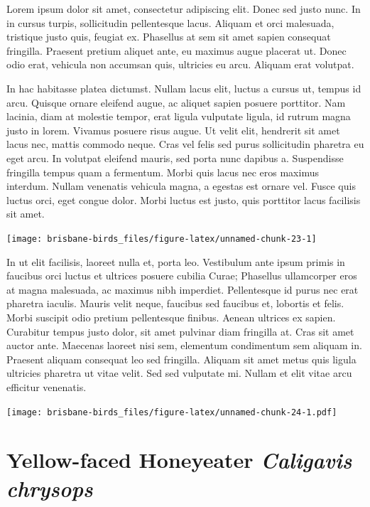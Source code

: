 \documentclass[]{book}
\let\origfigure\figure
\let\endorigfigure\endfigure
\renewenvironment{figure}[1][2] {
  \expandafter\origfigure\expandafter[H]
} {
  \endorigfigure
}
\begin{document}
Lorem ipsum dolor sit amet, consectetur adipiscing elit. Donec sed justo
nunc. In in cursus turpis, sollicitudin pellentesque lacus. Aliquam et
orci malesuada, tristique justo quis, feugiat ex. Phasellus at sem sit
amet sapien consequat fringilla. Praesent pretium aliquet ante, eu
maximus augue placerat ut. Donec odio erat, vehicula non accumsan quis,
ultricies eu arcu. Aliquam erat volutpat.

In hac habitasse platea dictumst. Nullam lacus elit, luctus a cursus ut,
tempus id arcu. Quisque ornare eleifend augue, ac aliquet sapien posuere
porttitor. Nam lacinia, diam at molestie tempor, erat ligula vulputate
ligula, id rutrum magna justo in lorem. Vivamus posuere risus augue. Ut
velit elit, hendrerit sit amet lacus nec, mattis commodo neque. Cras vel
felis sed purus sollicitudin pharetra eu eget arcu. In volutpat eleifend
mauris, sed porta nunc dapibus a. Suspendisse fringilla tempus quam a
fermentum. Morbi quis lacus nec eros maximus interdum. Nullam venenatis
vehicula magna, a egestas est ornare vel. Fusce quis luctus orci, eget
congue dolor. Morbi luctus est justo, quis porttitor lacus facilisis sit
amet.

\begin{figure}
\texttt{[image: brisbane-birds\_files/figure-latex/unnamed-chunk-23-1]} \caption{insert figure caption}\label{fig:unnamed-chunk-23}
\end{figure}

In ut elit facilisis, laoreet nulla et, porta leo. Vestibulum ante ipsum
primis in faucibus orci luctus et ultrices posuere cubilia Curae;
Phasellus ullamcorper eros at magna malesuada, ac maximus nibh
imperdiet. Pellentesque id purus nec erat pharetra iaculis. Mauris velit
neque, faucibus sed faucibus et, lobortis et felis. Morbi suscipit odio
pretium pellentesque finibus. Aenean ultrices ex sapien. Curabitur
tempus justo dolor, sit amet pulvinar diam fringilla at. Cras sit amet
auctor ante. Maecenas laoreet nisi sem, elementum condimentum sem
aliquam in. Praesent aliquam consequat leo sed fringilla. Aliquam sit
amet metus quis ligula ultricies pharetra ut vitae velit. Sed sed
vulputate mi. Nullam et elit vitae arcu efficitur venenatis.

\begin{figure}
\centering
\texttt{[image: brisbane-birds\_files/figure-latex/unnamed-chunk-24-1.pdf]}
\caption{\label{fig:unnamed-chunk-24}insert figure caption}
\end{figure}

\section{\texorpdfstring{Yellow-faced Honeyeater \emph{Caligavis
chrysops}}{Yellow-faced Honeyeater Caligavis chrysops}}\label{yellow-faced-honeyeater-caligavis-chrysops}
\end{document}
